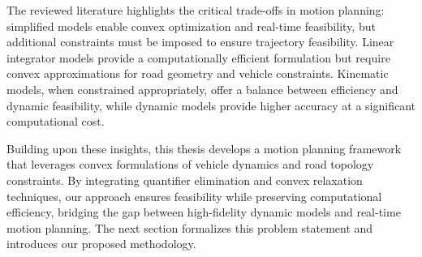 The reviewed literature highlights the critical trade-offs in motion planning: simplified models enable convex optimization and real-time
feasibility, but additional constraints must be imposed to ensure trajectory feasibility.
Linear integrator models provide a computationally efficient formulation but require convex approximations for road geometry and vehicle constraints.
Kinematic models, when constrained appropriately, offer a balance between efficiency and dynamic feasibility, while dynamic models provide higher
accuracy at a significant computational cost.

Building upon these insights, this thesis develops a motion planning framework that leverages convex formulations of vehicle dynamics and road
topology constraints.
By integrating quantifier elimination and convex relaxation techniques, our approach ensures feasibility while preserving computational efficiency,
bridging the gap between high-fidelity dynamic models and real-time motion planning.
The next section formalizes this problem statement and introduces our proposed methodology.

